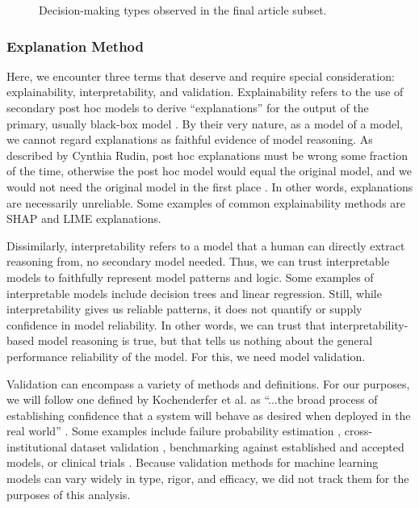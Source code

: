 \documentclass[authoryear,preprint,12pt]{elsarticle}
\begin{document}
\begin{figure}[ht!]
    \centering
    \resizebox{\textwidth}{!}{}
    \caption{Decision-making types observed in the final article subset.}
    \label{fig:dm_type}
\end{figure}
\FloatBarrier

\subsubsection{Explanation Method}
Here, we encounter three terms that deserve and require special consideration:
explainability, interpretability, and validation. Explainability refers to the
use of secondary post hoc models to derive ``explanations'' for the output of
the primary, usually black-box model \cite{rudinStopExplainingBlack2019}. By
their very nature, as a model of a model, we cannot regard explanations as
faithful evidence of model reasoning. As described by Cynthia Rudin, post hoc
explanations must be wrong some fraction of the time, otherwise the post hoc
model would equal the original model, and we would not need the original model
in the first place \cite{rudinStopExplainingBlack2019}. In other words,
explanations are necessarily unreliable. Some examples of common explainability
methods are SHAP and LIME explanations. 

Dissimilarly, interpretability refers to a model that a human can directly
extract reasoning from, no secondary model needed. Thus, we can trust
interpretable models to faithfully represent model patterns and logic. Some
examples of interpretable models include decision trees and linear regression.
Still, while interpretability gives us reliable patterns, it does not quantify
or supply confidence in model reliability. In other words, we can trust that
interpretability-based model reasoning is true, but that tells us nothing about
the general performance reliability of the model. For this, we need model
validation. 

Validation can encompass a variety of methods and definitions. For our purposes,
we will follow one defined by Kochenderfer et al. as ``...the broad process of
establishing confidence that a system will behave as desired when deployed in
the real world'' \cite{kochenderferAlgorithms}. Some examples include failure
probability estimation \cite{mossBayesianSafetyValidation2024}, cross-institutional dataset validation \cite{taylorLeveragingArtificialIntelligence2025}, benchmarking against established and accepted models, or
clinical trials \cite{nimriInsulinDoseOptimization2020}. Because validation methods for machine learning models can vary
widely in type, rigor, and efficacy, we did not track them for the purposes of
this analysis.  
\end{document}
